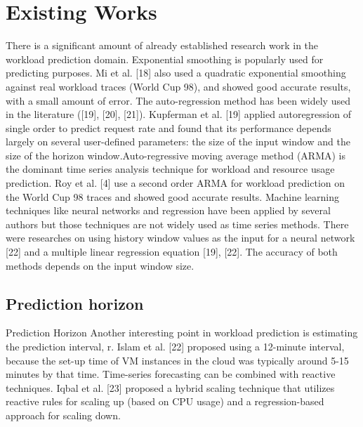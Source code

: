 \section{Existing Works}

There is a significant amount of already established research work in the workload prediction domain. Exponential smoothing is popularly used for predicting purposes. Mi et al. [18] also used a quadratic exponential smoothing against real workload traces (World Cup 98), and showed good accurate results, with a small amount of error. The auto-regression method has been widely used in the literature ([19], [20], [21]). Kupferman et al. [19] applied autoregression of single order to predict request rate and found that its performance depends largely on several user-defined parameters: the size of the input window and the size of the horizon window.Auto-regressive moving average method (ARMA) is the dominant time series analysis technique for workload and resource usage prediction. Roy et al. [4] use a second order ARMA for workload prediction on the World Cup 98 traces and showed good accurate results. Machine learning techniques like neural networks and regression have been applied by several authors but those techniques are not widely used as time series methods. There were researches on using history window values as the input for a neural network [22] and a multiple linear regression equation [19], [22]. The accuracy of both methods depends on the input window size.

\subsection{Prediction horizon}

Prediction Horizon
Another interesting point in workload prediction is estimating the prediction interval, r. Islam et al. [22] proposed using a 12-minute interval, because the set-up time of VM instances in the cloud was typically around 5-15 minutes by that time. Time-series forecasting can be combined with reactive techniques. Iqbal et al. [23] proposed a hybrid scaling technique that utilizes reactive rules for scaling up (based on CPU usage) and a regression-based approach for scaling down.